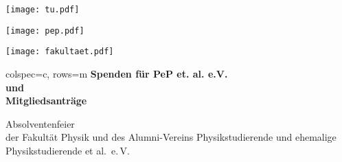 \documentclass[paper=landscape]{scrartcl}
\begin{document}
\begin{minipage}{0.44\textwidth}%
  \texttt{[image: tu.pdf]}%
\end{minipage}%
\begin{minipage}{0.25\textwidth}%
  \centering
  \texttt{[image: pep.pdf]}%
\end{minipage}%
\begin{minipage}{0.29\textwidth}%
  \raggedleft%
  \texttt{[image: fakultaet.pdf]}%
\end{minipage}%

\vfill

\begin{center}
    \begin{tblr}{colspec={c}, rows={m}}
        {%
            \fontsize{60}{70}\bfseries\selectfont
            Spenden für PeP et. al. e.V. \\
            und \\
            Mitgliedsanträge
        }\\
    \end{tblr}
\end{center}

\vfill

\begin{center}
  \huge Absolventenfeier\\
  der Fakultät Physik und des Alumni-Vereins
  Physikstudierende und ehemalige Physikstudierende et al.\ e.\,V.
\end{center}
  
\end{document}
